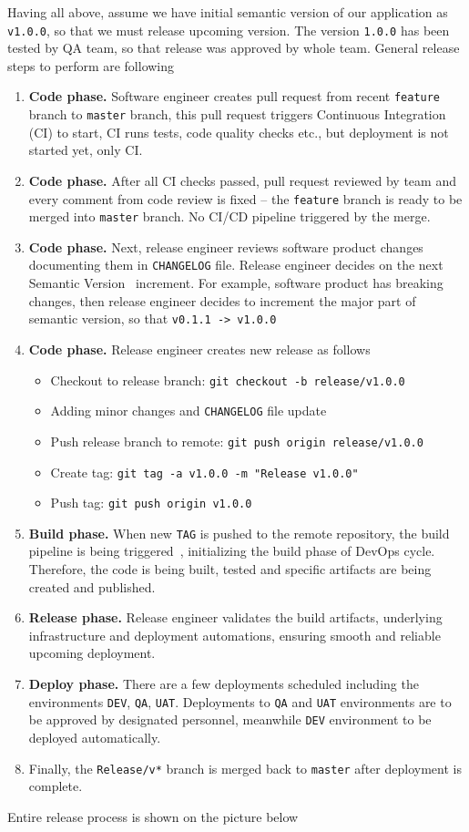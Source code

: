 ﻿Having all above, assume we have initial semantic version of our application as \texttt{v1.0.0},
so that we must release upcoming version.
The version \texttt{1.0.0} has been tested by QA team, so that release was approved by whole team.
General release steps to perform are following
\begin{enumerate}
    \item \textbf{Code phase.}
    Software engineer creates pull request from recent \texttt{feature} branch to \texttt{master} branch,
    this pull request triggers Continuous Integration (CI) to start, CI runs tests, code quality checks etc.,
    but deployment is not started yet, only CI\@.
    \item \textbf{Code phase.}
    After all CI checks passed, pull request reviewed by team and every comment from code review is fixed --
    the \texttt{feature} branch is ready to be merged into \texttt{master} branch.
    No CI/CD pipeline triggered by the merge.
    \item \textbf{Code phase.}
    Next, release engineer reviews software product changes documenting them in \texttt{CHANGELOG} file.
    Release engineer decides on the next Semantic Version~\cite{SemanticVersioning} increment.
    For example, software product has breaking changes,
    then release engineer decides to increment the major part of semantic version, so that \texttt{v0.1.1 -> v1.0.0}
    \item \textbf{Code phase.}
    Release engineer creates new release as follows
    \begin{itemize}
        \item Checkout to release branch: \texttt{git checkout -b release/v1.0.0}
        \item Adding minor changes and \texttt{CHANGELOG} file update
        \item Push release branch to remote: \texttt{git push origin release/v1.0.0}
        \item Create tag: \texttt{git tag -a v1.0.0 -m "Release v1.0.0"}
        \item Push tag: \texttt{git push origin v1.0.0}
    \end{itemize}
    \item \textbf{Build phase.}
    When new \texttt{TAG} is pushed to the remote repository, the build pipeline is being triggered~\cite{AzurePipelinesTriggers},
    initializing the build phase of DevOps cycle.
    Therefore, the code is being built, tested and specific artifacts are being created and published.
    \item \textbf{Release phase.} Release engineer validates the build artifacts,
    underlying infrastructure and deployment automations, ensuring smooth and reliable upcoming deployment.
    \item \textbf{Deploy phase.}
    There are a few deployments scheduled including the environments \texttt{DEV}, \texttt{QA}, \texttt{UAT}.
    Deployments to \texttt{QA} and \texttt{UAT} environments are to be approved by designated personnel,
    meanwhile \texttt{DEV} environment to be deployed automatically.
    \item Finally, the \texttt{Release/v*} branch is merged back to \texttt{master} after deployment is complete.
\end{enumerate}
Entire release process is shown on the picture below

